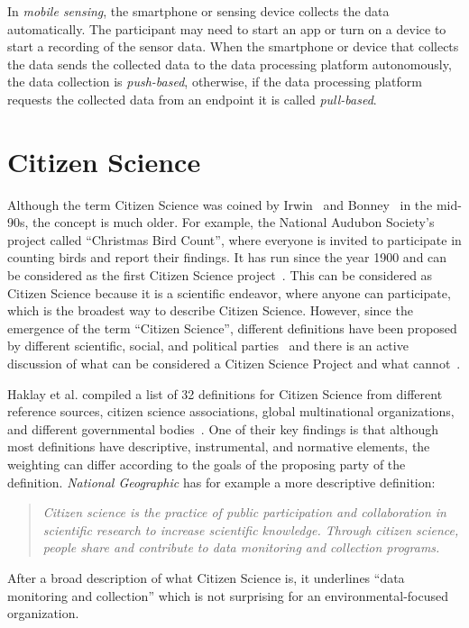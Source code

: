 In \textit{mobile sensing}, the smartphone or sensing device collects the data automatically.
The participant may need to start an app or turn on a device to start a recording of the sensor data.
When the smartphone or device that collects the data sends the collected data to the data processing platform autonomously, the data collection is \textit{push-based}, otherwise, if the data processing platform requests the collected data from an endpoint it is called \textit{pull-based}. 

\section{Citizen Science}
\label{sec:citizen_science_background}
Although the term Citizen Science was coined by Irwin~\cite{irwin1995citizen} and Bonney~\cite{bonney1996citizen} in the mid-90s, the concept is much older.
For example, the National Audubon Society's project called ``Christmas Bird Count'', where everyone is invited to participate in counting birds and report their findings.
It has run since the year 1900 and can be considered as the first Citizen Science project~\cite{silvertown2009new}.
This can be considered as Citizen Science because it is a scientific endeavor, where anyone can participate, which is the broadest way to describe Citizen Science.
However, since the emergence of the term ``Citizen Science'', different definitions have been proposed by different scientific, social, and political parties~\cite{heigl2019toward,ecsa2015ten,us2016crowdsourcing} and there is an active discussion of what can be considered a Citizen Science Project and what cannot~\cite{haklay2021citizen}. 

Haklay et al. compiled a list of 32 definitions for Citizen Science from different reference sources, citizen science associations, global multinational organizations, and different governmental bodies~\cite{haklay2021citizen}.
One of their key findings is that although most definitions have descriptive, instrumental, and normative elements, the weighting can differ according to the goals of the proposing party of the definition.
\textit{National Geographic} has for example a more descriptive definition:
\begin{quote}
\textit{Citizen science is the practice of public participation and collaboration in scientific research to increase scientific knowledge. Through citizen science, people share and contribute to data monitoring and collection programs.}
\end{quote}
After a broad description of what Citizen Science is, it underlines ``data monitoring and collection'' which is not surprising for an environmental-focused organization.


